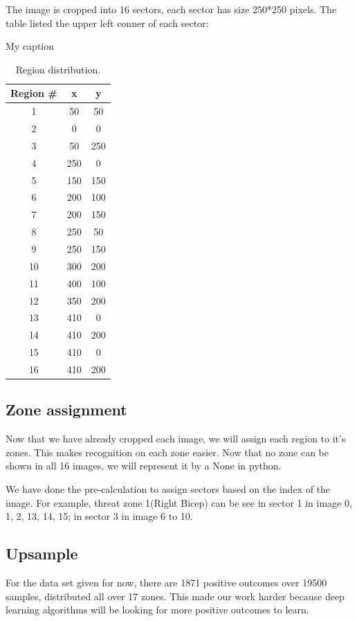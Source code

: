 \documentclass[conference,compsoc]{IEEEtran}
\begin{document}
The image is cropped into 16 sectors, each sector has size 250*250 pixels. The table listed the upper left conner of each sector:
\begin{table}[!htb]
    \centering
    \caption{My caption}
    \label{my-label}
    \begin{tabular}{ccc}
        \hline
        Region \# & x   & y   \\ \hline
        1         & 50  & 50  \\ \hline
        2         & 0   & 0   \\ \hline
        3         & 50  & 250 \\ \hline
        4         & 250 & 0   \\ \hline
        5         & 150 & 150 \\ \hline
        6         & 200 & 100 \\ \hline
        7         & 200 & 150 \\ \hline
        8         & 250 & 50  \\ \hline
        9         & 250 & 150 \\ \hline
        10        & 300 & 200 \\ \hline
        11        & 400 & 100 \\ \hline
        12        & 350 & 200 \\ \hline
        13        & 410 & 0   \\ \hline
        14        & 410 & 200 \\ \hline
        15        & 410 & 0   \\ \hline
        16        & 410 & 200 \\ \hline
    \end{tabular}
    \caption{Region distribution.}
\end{table}
\subsection{Zone assignment}
Now that we have already cropped each image, we will assign each region to it's zones. This makes recognition on each zone easier. Now that no zone can be shown in all 16 images, we will represent it by a None in python.

We have done the pre-calculation to assign sectors based on the index of the image. For example, threat zone 1(Right Bicep) can be see in sector 1 in image 0, 1, 2, 13, 14, 15; in sector 3 in image 6 to 10.

\subsection{Upsample}
For the data set given for now, there are 1871 positive outcomes over 19500 samples, distributed all over 17 zones. This made our work harder because deep learning algorithms will be looking for more positive outcomes to learn. 
\end{document}
